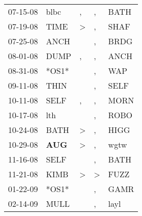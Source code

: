 \begin{supertabular}{p{0.07\textwidth}p{0.06\textwidth}p{0.02\textwidth}p{0.02\textwidth}p{0.06\textwidth}}
          07-15-08\textsuperscript{} &           blbc\textsuperscript{} &                , &                , &           BATH\textsuperscript{} \\
          07-19-08\textsuperscript{} &           TIME\textsuperscript{} &     \textgreater &                , &           SHAF\textsuperscript{} \\
          07-25-08\textsuperscript{} &           ANCH\textsuperscript{} &                  &                , &           BRDG\textsuperscript{} \\
          08-01-08\textsuperscript{} &           DUMP\textsuperscript{} &                , &                , &           ANCH\textsuperscript{} \\
          08-31-08\textsuperscript{} &                            *OS1* &                  &                , &            WAP\textsuperscript{} \\
          09-11-08\textsuperscript{} &           THIN\textsuperscript{} &                  &                , &           SELF\textsuperscript{} \\
          10-11-08\textsuperscript{} &           SELF\textsuperscript{} &                , &                , &           MORN\textsuperscript{} \\
          10-17-08\textsuperscript{} &            lth\textsuperscript{} &                  &                , &           ROBO\textsuperscript{} \\
          10-24-08\textsuperscript{} &           BATH\textsuperscript{} &     \textgreater &                , &           HIGG\textsuperscript{} \\
          10-29-08\textsuperscript{} &   \textbf{AUG\textsuperscript{}} &     \textgreater &                , &           wgtw\textsuperscript{} \\
          11-16-08\textsuperscript{} &           SELF\textsuperscript{} &                  &                , &           BATH\textsuperscript{} \\
          11-21-08\textsuperscript{} &           KIMB\textsuperscript{} &     \textgreater &     \textgreater &           FUZZ\textsuperscript{} \\
          01-22-09\textsuperscript{} &                            *OS1* &                  &                , &           GAMR\textsuperscript{} \\
          02-14-09\textsuperscript{} &           MULL\textsuperscript{} &                  &                , &           layl\textsuperscript{} \\

\end{supertabular}
